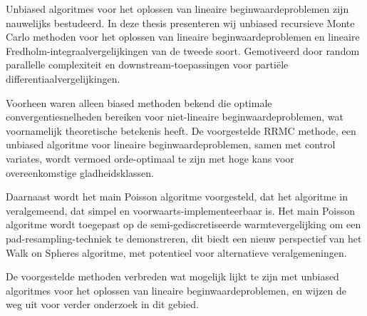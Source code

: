 Unbiased algoritmes voor het oplossen van lineaire beginwaardeproblemen zijn
nauwelijks bestudeerd.
In deze thesis presenteren wij unbiased recursieve Monte Carlo methoden
voor het oplossen van lineaire beginwaardeproblemen en lineaire Fredholm-integraalvergelijkingen
van de tweede soort. Gemotiveerd door random
parallelle complexiteit en downstream-toepassingen voor partiële differentiaalvergelijkingen.

Voorheen waren alleen biased methoden bekend die optimale convergentiesnelheden bereiken
voor niet-lineaire beginwaardeproblemen, wat voornamelijk theoretische betekenis heeft.
De voorgestelde RRMC methode, een unbiased algoritme voor lineaire beginwaardeproblemen,
samen met control variates, wordt vermoed orde-optimaal te zijn met hoge kans
voor overeenkomstige gladheidsklassen.

Daarnaast wordt het main Poisson algoritme voorgesteld, dat het algoritme in \cite{acebron_monte_2016} veralgemeend,
dat simpel en voorwaarts-implementeerbaar is. Het main Poisson algoritme wordt toegepast op de semi-gediscretiseerde
warmtevergelijking om een pad-resampling-techniek te demonstreren, dit biedt een nieuw perspectief van
het Walk on Spheres algoritme,
met potentieel voor alternatieve veralgemeningen.

De voorgestelde methoden verbreden
wat mogelijk lijkt te zijn met unbiased algoritmes voor
het oplossen van lineaire beginwaardeproblemen,
en wijzen de weg uit voor verder onderzoek in dit gebied.
